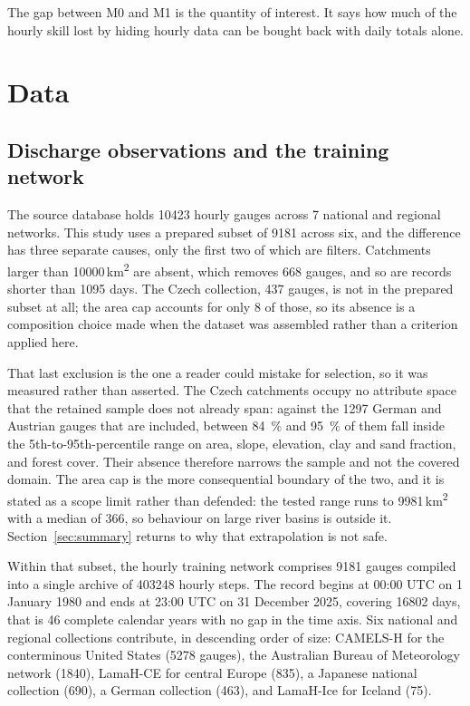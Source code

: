 \documentclass[11pt,a4paper]{article}
\begin{document}
The gap between M0 and M1 is the quantity of interest. It says how much of the hourly skill lost by hiding hourly data can be bought back with daily totals alone.

\section{Data}\label{sec:data}
\subsection{Discharge observations and the training network}

The source database holds \num{10423} hourly gauges across 7 national and regional networks. This study uses a prepared subset of \num{9181} across six, and the difference has three separate causes, only the first two of which are filters. Catchments larger than \num{10000}\,\si{\km\squared} are absent, which removes \num{668} gauges, and so are records shorter than \num{1095} days. The Czech collection, \num{437} gauges, is not in the prepared subset at all; the area cap accounts for only \num{8} of those, so its absence is a composition choice made when the dataset was assembled rather than a criterion applied here.

That last exclusion is the one a reader could mistake for selection, so it was measured rather than asserted. The Czech catchments occupy no attribute space that the retained sample does not already span: against the \num{1297} German and Austrian gauges that are included, between \SI{84}{\percent} and \SI{95}{\percent} of them fall inside the 5th-to-95th-percentile range on area, slope, elevation, clay and sand fraction, and forest cover. Their absence therefore narrows the sample and not the covered domain. The area cap is the more consequential boundary of the two, and it is stated as a scope limit rather than defended: the tested range runs to \num{9981}\,\si{\km\squared} with a median of \num{366}, so behaviour on large river basins is outside it. Section~\ref{sec:summary} returns to why that extrapolation is not safe.

Within that subset, the hourly training network comprises \num{9181} gauges compiled into a single archive of
\num{403248} hourly steps. The record begins at 00:00 UTC on 1 January 1980 and ends at
23:00 UTC on 31 December 2025, covering \num{16802} days, that is \num{46} complete
calendar years with no gap in the time axis. Six national and regional collections contribute, in descending order of
size: CAMELS-H for the conterminous United States (\num{5278} gauges), the Australian
Bureau of Meteorology network (\num{1840}), LamaH-CE for central Europe (\num{835}), a
Japanese national collection (\num{690}), a German collection (\num{463}), and LamaH-Ice for
Iceland (\num{75}).
\end{document}
